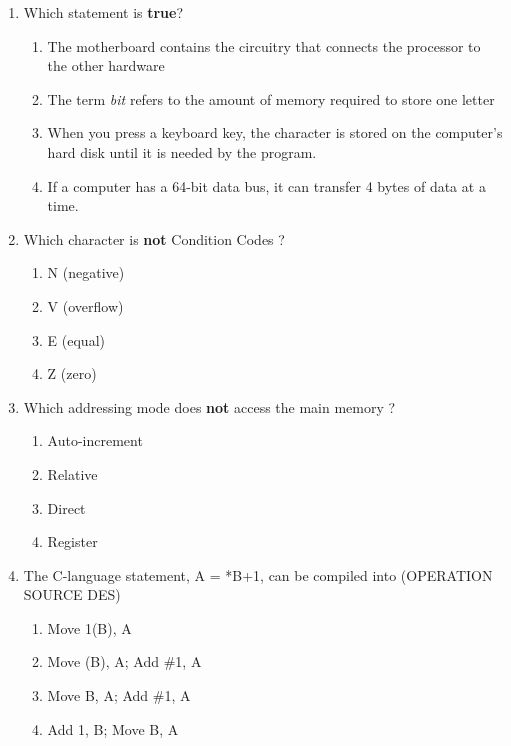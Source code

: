 \documentclass[a4paper,12pt]{article}
\begin{document}
\begin{enumerate}[label=\textbf{\arabic*.}]
    \item Which statement is \textbf{true}?
    \begin{enumerate}[label=\alph*)]
        \item The motherboard contains the circuitry that connects the processor to the other hardware
        \item The term \textit{bit} refers to the amount of memory required to store one letter
        \item When you press a keyboard key, the character is stored on the computer's hard disk until it is needed by the program.
        \item If a computer has a 64-bit data bus, it can transfer 4 bytes of data at a time.
    \end{enumerate}

    \item Which character is \textbf{not} Condition Codes ?
    \begin{enumerate}[label=\alph*)]
        \item N (negative)
        \item V (overflow)
        \item E (equal)
        \item Z (zero)
    \end{enumerate}

    \item Which addressing mode does \textbf{not} access the main memory ?
    \begin{enumerate}[label=\alph*)]
        \item Auto-increment
        \item Relative
        \item Direct
        \item Register
    \end{enumerate}

    \item The C-language statement, A = *B+1, can be compiled into (OPERATION SOURCE DES)
    \begin{enumerate}[label=\alph*)]
        \item Move 1(B), A
        \item Move (B), A; Add \#1, A
        \item Move B, A; Add \#1, A
        \item Add 1, B; Move B, A
    \end{enumerate}


\end{enumerate}
\end{document}
